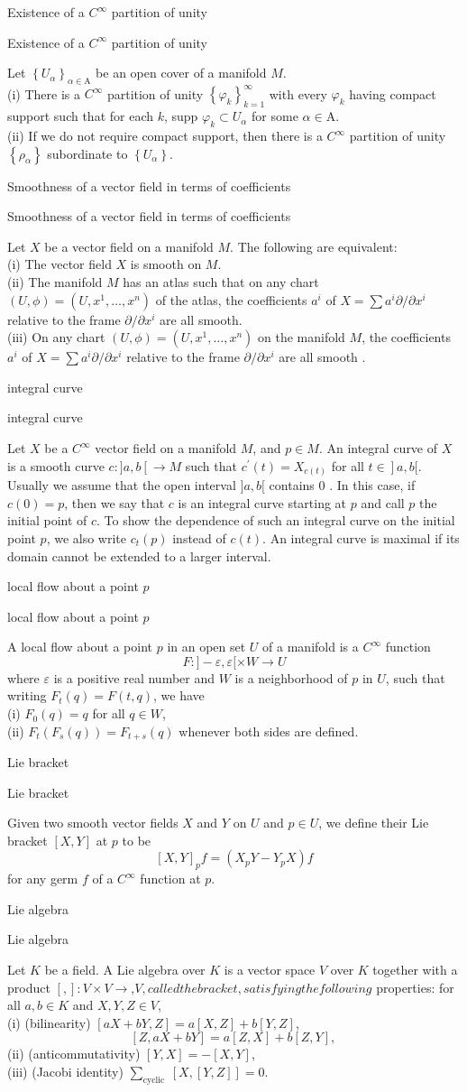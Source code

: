 \documentclass[17pt]{extarticle}
\newcommand{\boxset}[2]{\begin{mdframed}[style=darkQuesion]
#1
\end{mdframed}
\newpage
\begin{mdframed}[style=darkQuesion]
  #1
    \end{mdframed}
\begin{mdframed}[style=darkAnswer]
  #2
    \end{mdframed}
    \newpage
}
\begin{document}
\boxset{Existence of a $C^{\infty}$ partition of unity }
{Let $\left\{U_{\alpha}\right\}_{\alpha \in \mathrm{A}}$ be an open cover of a manifold $M$.\[\ \] (i) There is a $C^{\infty}$ partition of unity $\left\{\varphi_{k}\right\}_{k=1}^{\infty}$ with every $\varphi_{k}$ having compact support such that for each $k$, supp $\varphi_{k} \subset U_{\alpha}$ for some $\alpha \in \mathrm{A}$.\[\ \] (ii) If we do not require compact support, then there is a $C^{\infty}$ partition of unity $\left\{\rho_{\alpha}\right\}$ subordinate to $\left\{U_{\alpha}\right\}$.}
\boxset{Smoothness of a vector field in terms of coefficients }
{Let $X$ be a vector field on a manifold $M$. The following are equivalent:\[\ \] (i) The vector field $X$ is smooth on $M$.\[\ \] (ii) The manifold $M$ has an atlas such that on any chart $(U, \phi)=\left(U, x^{1}, \ldots, x^{n}\right)$ of the atlas, the coefficients $a^{i}$ of $X=\sum a^{i} \partial / \partial x^{i}$ relative to the frame $\partial / \partial x^{i}$ are all smooth.\[\ \] (iii) On any chart $(U, \phi)=\left(U, x^{1}, \ldots, x^{n}\right)$ on the manifold $M$, the coefficients $a^{i}$ of $X=\sum a^{i} \partial / \partial x^{i}$ relative to the frame $\partial / \partial x^{i}$ are all smooth .}
\boxset{integral curve }
{Let $X$ be a $C^{\infty}$ vector field on a manifold $M$, and $p \in M$. An integral curve of $X$ is a smooth curve $c:] a, b\left[\rightarrow M\right.$ such that $c^{\prime}(t)=X_{c(t)}$ for all $\left.t \in\right] a, b[$. Usually we assume that the open interval $] a, b[$ contains 0 . In this case, if $c(0)=p$, then we say that $c$ is an integral curve starting at $p$ and call $p$ the initial point of $c$. To show the dependence of such an integral curve on the initial point $p$, we also write $c_{t}(p)$ instead of $c(t)$. An integral curve is maximal if its domain cannot be extended to a larger interval.}
\boxset{local flow about a point $p$ }
{A local flow about a point $p$ in an open set $U$ of a manifold is a $C^{\infty}$ function \[F:]-\varepsilon, \varepsilon[\times W \rightarrow U\] where $\varepsilon$ is a positive real number and $W$ is a neighborhood of $p$ in $U$, such that writing $F_{t}(q)=F(t, q)$, we have\[\ \] (i) $F_{0}(q)=q$ for all $q \in W$,\[\ \] (ii) $F_{t}\left(F_{s}(q)\right)=F_{t+s}(q)$ whenever both sides are defined.}
\boxset{Lie bracket }
{Given two smooth vector fields $X$ and $Y$ on $U$ and $p \in U$, we define their Lie bracket $[X, Y]$ at $p$ to be \[[X, Y]_{p} f=\left(X_{p} Y-Y_{p} X\right) f\] for any germ $f$ of a $C^{\infty}$ function at $p$. }
\boxset{Lie algebra }
{Let $K$ be a field. A Lie algebra over $K$ is a vector space $V$ over $K$ together with a product $[,]: V \times V \rightarrow$,$V , called the bracket, satisfying the following$ properties: for all $a, b \in K$ and $X, Y, Z \in V$,\[\ \] (i) (bilinearity) $[a X+b Y, Z]=a[X, Z]+b[Y, Z]$,\[[Z, a X+b Y]=a[Z, X]+b[Z, Y] \text {, }\] (ii) (anticommutativity) $[Y, X]=-[X, Y]$,\[\ \] (iii) (Jacobi identity) $\sum_{\text {cyclic }}[X,[Y, Z]]=0$.\[\ \]}
\end{document}
